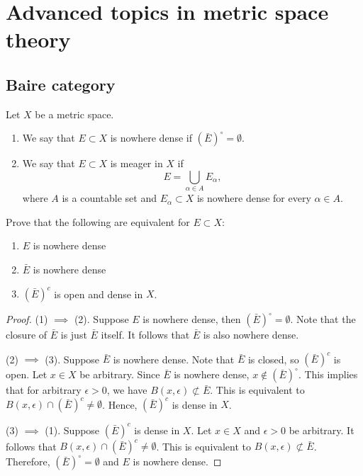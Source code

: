\documentclass[a4paper]{article}
\begin{document}
\maketitle

\tableofcontents

\section{Advanced topics in metric space theory}

\subsection{Baire category}

\begin{defi}
Let $X$ be a metric space.
\begin{enumerate}
 \item We say that $E \subset X$ is nowhere dense if
 $(\bar{E})^\circ = \emptyset$.
 \item We say that $E \subset X$ is meager in $X$ if
\[
 E = \bigcup_{\alpha \in A} E_\alpha,
\]
where $A$ is a countable set and $E_\alpha \subset X$
is nowhere dense for every $\alpha \in A$.
\end{enumerate}
\end{defi}

\begin{thm}
Prove that the following are equivalent for
$E \subset X$:
\begin{enumerate}
 \item $E$ is nowhere dense
 \item $\bar{E}$ is nowhere dense
 \item $(\bar{E})^c$ is open and dense in $X$.
\end{enumerate}
\end{thm}

\begin{proof}
  (1) $\implies$ (2). Suppose $E$ is nowhere dense, then
  $(\bar{E})^\circ = \emptyset$. Note that the closure
  of $\bar{E}$ is just $\bar{E}$ itself. It follows that
  $\bar{E}$ is also nowhere dense.

  (2) $\implies$ (3). Suppose $\bar{E}$ is nowhere dense.
  Note that $\bar{E}$ is closed, so $(\bar{E})^c$ is open.
  Let $x \in X$ be arbitrary. Since $\bar{E}$ is nowhere dense,
  $x \notin (\bar{E})^\circ$. This implies that for arbitrary
  $\epsilon > 0$, we have $B(x, \epsilon) \nsubset \bar{E}$.
  This is equivalent to $B(x, \epsilon) \cap (\bar{E})^c \neq
  \emptyset$. Hence, $(\bar{E})^c$ is dense in $X$.

  (3) $\implies$ (1). Suppose $(\bar{E})^c$ is dense in $X$.
  Let $x \in X$ and $\epsilon > 0$ be arbitrary. It follows
  that $B(x, \epsilon) \cap (\bar{E})^c \neq \emptyset$.
  This is equivalent to $B(x, \epsilon) \nsubset \bar{E}$.
  Therefore, $(\bar{E})^\circ = \emptyset$ and $E$ is nowhere
  dense.

\end{proof}
\end{document}
